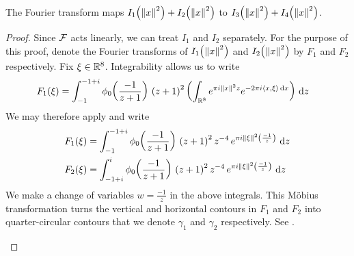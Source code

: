 \begin{boxlemma}\label{Ch4:Lemma:Fourier_I_1_add_I_2_eq_I_3_add_I_4}
    The Fourier transform %
    maps $I_1\!\left( \left\lVert x \right\rVert^2 \right) + I_2\!\left( \left\lVert x \right\rVert^2 \right)$ to $I_3\!\left( \left\lVert x \right\rVert^2 \right) + I_4\!\left( \left\lVert x \right\rVert^2 \right)$.
\end{boxlemma}
\begin{proof}
    Since $\mathcal{F}$ acts linearly, we can treat $I_1$ and $I_2$ separately. For the purpose of this proof, denote the Fourier transforms of $I_1\!\left( \left\lVert x \right\rVert^2 \right)$ and $I_2\!\left( \left\lVert x \right\rVert^2 \right)$ by $F_1$ and $F_2$ respectively. Fix $\xi \in \mathbb{R}^8$. Integrability allows us to write
    \begin{align*}
        F_1\!\left( \xi \right)
        &= \int_{-1}^{-1 + i} \phi_0\!\left( \frac{-1}{z+1} \right) \, \left( z + 1 \right)^2 \left( \int_{\mathbb{R}^8} e^{\pi i \left\lVert x \right\rVert^2 z} e^{-2\pi i \left\langle x, \xi \right\rangle \operatorname{d}\!{x}} \right) \, \operatorname{d}\!{z}
    \end{align*}
    We may therefore apply  and write
    \begin{align*}
        F_1\!\left( \xi \right) &= \int_{-1}^{-1 + i} \phi_0\!\left( \frac{-1}{z+1} \right) \, \left( z + 1 \right)^2z^{-4} \, e^{\pi i \left\lVert \xi \right\rVert^2 \left( \frac{-1}{z} \right)} \, \operatorname{d}\!{z} \\
        F_2\!\left( \xi \right) &= \int_{-1 + i}^{i} \phi_0\!\left( \frac{-1}{z+1} \right) \, \left( z + 1 \right)^2z^{-4} \, e^{\pi i \left\lVert \xi \right\rVert^2 \left( \frac{-1}{z} \right)} \, \operatorname{d}\!{z}
    \end{align*}
    We make a change of variables $w = \frac{-1}{z}$ in the above integrals. This Möbius transformation turns the vertical and horizontal contours in $F_1$ and $F_2$ into quarter-circular contours that we denote $\gamma_1$ and $\gamma_2$ respectively. See .

    \begin{figure}[htb]
        \centering
        \begin{subfigure}{0.4\linewidth}
            \centering
\end{subfigure}
\end{figure}
\end{proof}
